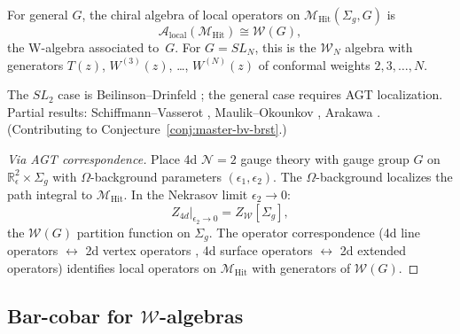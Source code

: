 \begin{conjecture}
\label{conj:w-algebra-hitchin}
For general $G$, the chiral algebra of local operators on $\mathcal{M}_{\mathrm{Hit}}(\Sigma_g, G)$ is
\[
\mathcal{A}_{\mathrm{local}}(\mathcal{M}_{\mathrm{Hit}}) \cong \mathcal{W}(G),
\]
the W-algebra associated to~$G$.  For $G = SL_N$, this is the
$\mathcal{W}_N$ algebra with generators
$T(z)$, $W^{(3)}(z)$, \ldots, $W^{(N)}(z)$
of conformal weights $2, 3, \ldots, N$.
\end{conjecture}

\begin{remark}[Scope]
The $SL_2$ case is Beilinson--Drinfeld \cite{BD04}; the general case requires AGT localization.  Partial results: Schiffmann--Vasserot \cite{SV13}, Maulik--Okounkov \cite{MO19}, Arakawa \cite{Ara07}.
(Contributing to Conjecture~\ref{conj:master-bv-brst}.)
\end{remark}

\begin{proof}[Via AGT correspondence]
Place 4d $\mathcal{N}=2$ gauge theory with gauge group $G$ on $\mathbb{R}^2_\epsilon \times \Sigma_g$ with $\Omega$-background parameters $(\epsilon_1, \epsilon_2)$.  The $\Omega$-background localizes the path integral to $\mathcal{M}_{\mathrm{Hit}}$.  In the Nekrasov limit $\epsilon_2 \to 0$:
\[Z_{4d}|_{\epsilon_2 \to 0} = Z_{\mathcal{W}}[\Sigma_g],\]
the $\mathcal{W}(G)$ partition function on $\Sigma_g$.  The operator correspondence (4d line operators $\leftrightarrow$ 2d vertex operators \cite{DNP25}, 4d surface operators $\leftrightarrow$ 2d extended operators) identifies local operators on $\mathcal{M}_{\mathrm{Hit}}$ with generators of $\mathcal{W}(G)$.
\end{proof}

\subsection{Bar-cobar for $\mathcal{W}$-algebras}

